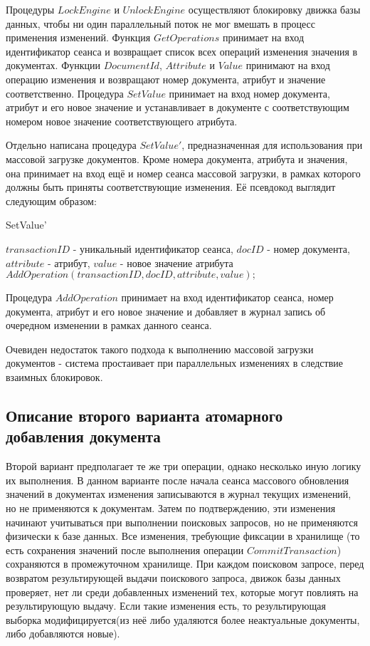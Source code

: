 \documentclass{matmex-diploma}
\begin{document}
        Процедуры $LockEngine$ и $UnlockEngine$ осуществляют блокировку движка базы данных, чтобы ни один параллельный поток не мог вмешать в процесс применения изменений. Функция $GetOperations$ принимает на вход идентификатор сеанса и возвращает список всех операций изменения значения в документах. Функции $DocumentId$, $Attribute$ и $Value$ принимают на вход операцию изменения и возвращают номер документа, атрибут и значение соответственно. Процедура $SetValue$ принимает на вход номер документа, атрибут и его новое значение и устанавливает в документе с соответствующим номером новое значение соответствующего атрибута.
        
        Отдельно написана процедура $SetValue'$, предназначенная для использования при массовой загрузке документов. Кроме номера документа, атрибута и значения, она принимает на вход ещё и номер сеанса массовой загрузки, в рамках которого должны быть приняты соответствующие изменения. Её псевдокод выглядит следующим образом:
        
        \begin{algorithm}[H]                   
        \caption{SetValue'}              
        \label{update}                        
            \begin{algorithmic}
                \REQUIRE $transactionID$ - уникальный идентификатор сеанса, $docID$ - номер документа, $attribute$ - атрибут, $value$ - новое значение атрибута
                \STATE $ AddOperation(transactionID, docID, attribute, value);$
            \end{algorithmic}
        \end{algorithm}
        
        Процедура $AddOperation$ принимает на вход идентификатор сеанса, номер документа, атрибут и его новое значение и добавляет в журнал запись об очередном изменении в рамках данного сеанса.
        
        Очевиден недостаток такого подхода к выполнению массовой загрузки документов - система простаивает при параллельных изменениях в следствие взаимных блокировок.
    \subsection{Описание второго варианта атомарного добавления документа}
        Второй вариант предполагает те же три операции, однако несколько иную логику их выполнения. В данном варианте после начала сеанса массового обновления значений в документах изменения записываются в журнал текущих изменений, но не применяются к документам. Затем по подтверждению, эти изменения начинают учитываться при выполнении поисковых запросов, но не применяются физически к базе данных. 
        Все изменения, требующие фиксации в хранилище (то есть сохранения значений после выполнения операции $CommitTransaction$) сохраняются в промежуточном хранилище.
        При каждом поисковом запросе, перед возвратом результирующей выдачи поискового запроса, движок базы данных проверяет, нет ли среди добавленных изменений тех, которые могут повлиять на результирующую выдачу. Если такие изменения есть, то результирующая выборка модифицируется(из неё либо удаляются более неактуальные документы, либо добавляются новые). 
        
\end{document}
